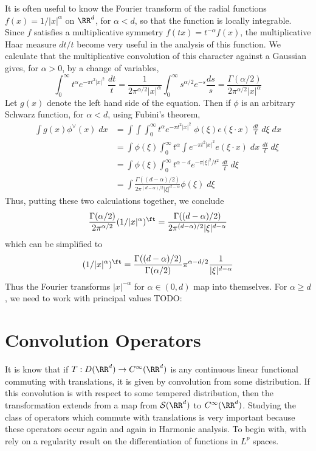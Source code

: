 \begin{example}
	It is often useful to know the Fourier transform of the radial functions $f(x) = 1/|x|^\alpha$ on $\RR^d$, for $\alpha < d$, so that the function is locally integrable. Since $f$ satisfies a multiplicative symmetry $f(tx) = t^{-\alpha} f(x)$, the multiplicative Haar measure $dt/t$ become very useful in the analysis of this function. We calculate that the multiplicative convolution of this character against a Gaussian gives, for $\alpha > 0$, by a change of variables,
    \[ \int_0^\infty t^\alpha e^{- \pi t^2 |x|^2}\; \frac{dt}{t} = \frac{1}{2\pi^{\alpha/2} |x|^\alpha} \int_0^\infty s^{\alpha/2} e^{-s} \frac{ds}{s} = \frac{\Gamma(\alpha/2)}{2 \pi^{\alpha/2} |x|^\alpha} \]
    Let $g(x)$ denote the left hand side of the equation. Then if $\phi$ is an arbitrary Schwarz function, for $\alpha < d$, using Fubini's theorem,
    \begin{align*}
    	\int g(x) \phi^\vee(x)\; dx &= \int \int \int_0^\infty t^\alpha e^{- \pi t^2 |x|^2}\; \phi(\xi) e(\xi \cdot x)\; \frac{dt}{t}\; d\xi\; dx\\
    	&= \int \phi(\xi) \int_0^\infty t^\alpha \int e^{- \pi t^2 |x|^2} e(\xi \cdot x)\; dx\; \frac{dt}{t}\; d\xi\\
    	&= \int \phi(\xi) \int_0^\infty t^{\alpha - d} e^{- \pi |\xi|^2/t^2}\; \frac{dt}{t}\; d\xi\\
    	&= \int \frac{\Gamma((d-\alpha)/2)}{2\pi^{(d-\alpha)/2} |\xi|^{d - \alpha}} \phi(\xi)\; d\xi
    \end{align*}
    Thus, putting these two calculations together, we conclude
    \[ \frac{\Gamma(\alpha/2)}{2 \pi^{\alpha/2}} (1/|x|^\alpha)^\ft = \frac{\Gamma((d-\alpha)/2)}{2 \pi^{(d-\alpha)/2} |\xi|^{d-\alpha}} \]
    which can be simplified to
    \[ (1/|x|^\alpha)^\ft = \frac{\Gamma((d-\alpha)/2)}{\Gamma(\alpha/2)} \pi^{\alpha-d/2} \frac{1}{|\xi|^{d-\alpha}} \]
    Thus the Fourier transforms $|x|^{-\alpha}$ for $\alpha \in (0,d)$ map into themselves. For $\alpha \geq d$, we need to work with principal values TODO:
\end{example}

\section{Convolution Operators}

It is know that if $T: D(\RR^d) \to C^\infty(\RR^d)$ is any continuous linear functional commuting with translations, it is given by convolution from some distribution. If this convolution is with respect to some tempered distribution, then the transformation extends from a map from $\mathcal{S}(\RR^d)$ to $C^\infty(\RR^d)$. Studying the class of operators which commute with translations is very important because these operators occur again and again in Harmonic analysis. To begin with, with rely on a regularity result on the differentiation of functions in $L^p$ spaces.

